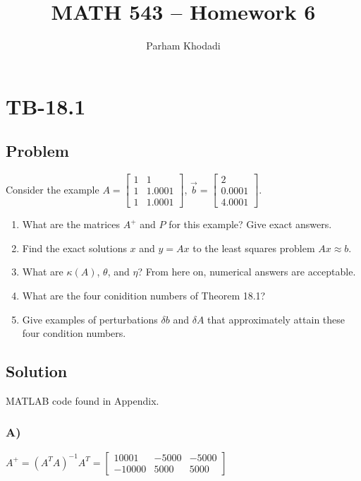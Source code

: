 \documentclass[11pt]{article}
\title{MATH 543 -- Homework 6}
\author{Parham Khodadi}
\date{}
\begin{document}
\maketitle

\section*{TB-18.1}

\subsection*{Problem}
Consider the example $A = \begin{bmatrix} 1 & 1 \\ 1 & 1.0001 \\ 1 & 1.0001 \end{bmatrix}$, $\vec{b} = \begin{bmatrix} 2 \\ 0.0001 \\ 4.0001 \end{bmatrix}$.

\begin{enumerate}[label=\Alph*)]
    \item What are the matrices $A^+$ and $P$ for this example? Give exact answers.
    \item Find the exact solutions $x$ and $y=Ax$ to the least squares problem $Ax \approx b$.
    \item What are $\kappa(A)$, $\theta$, and $\eta$? From here on, numerical answers are acceptable.
    \item What are the four conidition numbers of Theorem 18.1?
    \item Give examples of perturbations $\delta b$ and $\delta A$ that approximately attain these four condition numbers.
\end{enumerate}

\subsection*{Solution}
MATLAB code found in Appendix.

\subsubsection*{A)}
$A^+ = (A^T A)^{-1} A^T = \begin{bmatrix}
    10001 & -5000 & -5000 \\
    -10000 & 5000 & 5000 
\end{bmatrix}$
\end{document}

